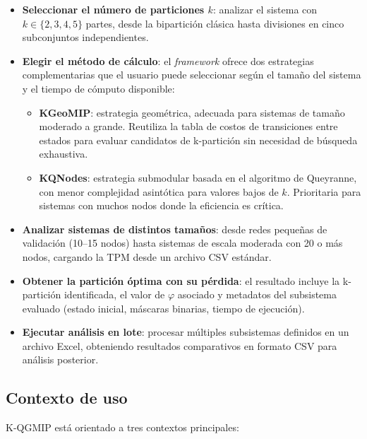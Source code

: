 \begin{itemize}
  \item \textbf{Seleccionar el número de particiones $k$}: analizar el sistema con
        $k \in \{2, 3, 4, 5\}$ partes, desde la bipartición clásica hasta divisiones
        en cinco subconjuntos independientes.

  \item \textbf{Elegir el método de cálculo}: el \textit{framework} ofrece dos estrategias
        complementarias que el usuario puede seleccionar según el tamaño del sistema y el
        tiempo de cómputo disponible:
        \begin{itemize}
          \item \textbf{KGeoMIP}: estrategia geométrica, adecuada para sistemas de tamaño
                moderado a grande. Reutiliza la tabla de costos de transiciones entre estados
                para evaluar candidatos de k-partición sin necesidad de búsqueda exhaustiva.
          \item \textbf{KQNodes}: estrategia submodular basada en el algoritmo de Queyranne,
                con menor complejidad asintótica para valores bajos de $k$.
                Prioritaria para sistemas con muchos nodos donde la eficiencia es crítica.
        \end{itemize}

  \item \textbf{Analizar sistemas de distintos tamaños}: desde redes pequeñas de validación
        (10--15 nodos) hasta sistemas de escala moderada con 20 o más nodos, cargando la TPM
        desde un archivo CSV estándar.

  \item \textbf{Obtener la partición óptima con su pérdida}: el resultado incluye la
        k-partición identificada, el valor de $\varphi$ asociado y metadatos del subsistema
        evaluado (estado inicial, máscaras binarias, tiempo de ejecución).

  \item \textbf{Ejecutar análisis en lote}: procesar múltiples subsistemas definidos en un
        archivo Excel, obteniendo resultados comparativos en formato CSV para análisis posterior.
\end{itemize}

\subsection*{Contexto de uso}

K-QGMIP está orientado a tres contextos principales:

